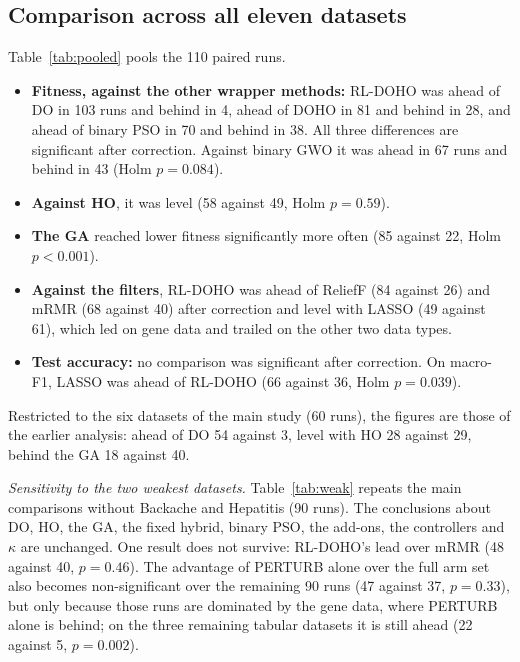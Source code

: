 \documentclass[journal]{IEEEtran}
\begin{document}
\subsection{Comparison across all eleven datasets}\label{sec:pooled}
Table~\ref{tab:pooled} pools the 110 paired runs.
\begin{itemize}
\item \textbf{Fitness, against the other wrapper methods:} RL-DOHO was ahead of DO in 103 runs and behind in 4, ahead of DOHO in 81 and behind in 28, and ahead of binary PSO in 70 and behind in 38. All three differences are significant after correction. Against binary GWO it was ahead in 67 runs and behind in 43 (Holm $p=0.084$).
\item \textbf{Against HO}, it was level (58 against 49, Holm $p=0.59$).
\item \textbf{The GA} reached lower fitness significantly more often (85 against 22, Holm $p<0.001$).
\item \textbf{Against the filters}, RL-DOHO was ahead of ReliefF (84 against 26) and mRMR (68 against 40) after correction and level with LASSO (49 against 61), which led on gene data and trailed on the other two data types.
\item \textbf{Test accuracy:} no comparison was significant after correction. On macro-F1, LASSO was ahead of RL-DOHO (66 against 36, Holm $p=0.039$).
\end{itemize}
Restricted to the six datasets of the main study (60 runs), the figures are those of the earlier analysis: ahead of DO 54 against 3, level with HO 28 against 29, behind the GA 18 against 40.

\emph{Sensitivity to the two weakest datasets.} Table~\ref{tab:weak} repeats the main comparisons without Backache and Hepatitis (90 runs). The conclusions about DO, HO, the GA, the fixed hybrid, binary PSO, the add-ons, the controllers and $\kappa$ are unchanged. One result does not survive: RL-DOHO's lead over mRMR (48 against 40, $p=0.46$). The advantage of PERTURB alone over the full arm set also becomes non-significant over the remaining 90 runs (47 against 37, $p=0.33$), but only because those runs are dominated by the gene data, where PERTURB alone is behind; on the three remaining tabular datasets it is still ahead (22 against 5, $p=0.002$).
\end{document}
